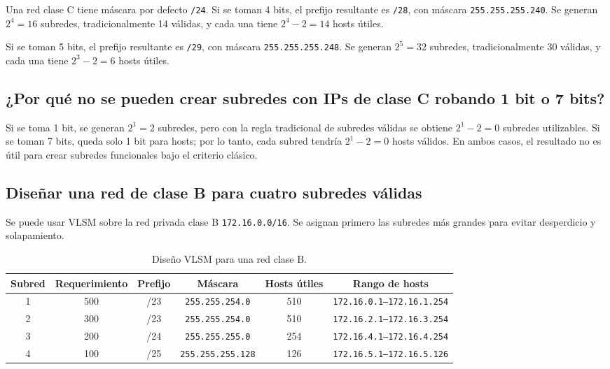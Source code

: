 \documentclass[a4paper,12pt]{article}
\newcommand{\ip}[1]{\mbox{\texttt{#1}}}
\begin{document}
Una red clase C tiene máscara por defecto \ip{/24}. Si se toman 4 bits, el prefijo resultante es \ip{/28}, con máscara \ip{255.255.255.240}. Se generan $2^4 = 16$ subredes, tradicionalmente 14 válidas, y cada una tiene $2^4 - 2 = 14$ hosts útiles.

Si se toman 5 bits, el prefijo resultante es \ip{/29}, con máscara \ip{255.255.255.248}. Se generan $2^5 = 32$ subredes, tradicionalmente 30 válidas, y cada una tiene $2^3 - 2 = 6$ hosts útiles.

\subsection{¿Por qué no se pueden crear subredes con IPs de clase C robando 1 bit o 7 bits?}

Si se toma 1 bit, se generan $2^1 = 2$ subredes, pero con la regla tradicional de subredes válidas se obtiene $2^1 - 2 = 0$ subredes utilizables. Si se toman 7 bits, queda solo 1 bit para hosts; por lo tanto, cada subred tendría $2^1 - 2 = 0$ hosts válidos. En ambos casos, el resultado no es útil para crear subredes funcionales bajo el criterio clásico.

\subsection{Diseñar una red de clase B para cuatro subredes válidas}

Se puede usar VLSM sobre la red privada clase B \ip{172.16.0.0/16}. Se asignan primero las subredes más grandes para evitar desperdicio y solapamiento.

\begin{table}[H]
\centering
\scriptsize
\begin{tabular}{|c|c|c|c|c|c|}
\hline
Subred & Requerimiento & Prefijo & Máscara & Hosts útiles & Rango de hosts \\
\hline
1 & 500 & /23 & \ip{255.255.254.0} & 510 & \ip{172.16.0.1--172.16.1.254} \\
2 & 300 & /23 & \ip{255.255.254.0} & 510 & \ip{172.16.2.1--172.16.3.254} \\
3 & 200 & /24 & \ip{255.255.255.0} & 254 & \ip{172.16.4.1--172.16.4.254} \\
4 & 100 & /25 & \ip{255.255.255.128} & 126 & \ip{172.16.5.1--172.16.5.126} \\
\hline
\end{tabular}
\caption{Diseño VLSM para una red clase B.}
\end{table}
\end{document}
